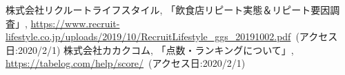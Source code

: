 \documentclass[honka]{nitkcthesis}%
\begin{document}








\backmatter



\begin{thebibliography}{99}
  株式会社リクルートライフスタイル,
   「飲食店リピート実態＆リピート要因調査」,
   \url{https://www.recruit-lifestyle.co.jp/uploads/2019/10/RecruitLifestyle\_ggs\_20191002.pdf}\ (アクセス日:2020/2/1)
  株式会社カカクコム,
   「点数・ランキングについて」,
   \url{https://tabelog.com/help/score/}\ (アクセス日:2020/2/1)
\end{thebibliography}



\appendix

\end{document}
